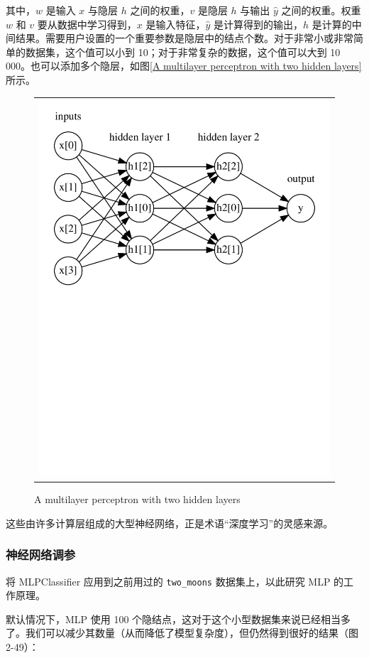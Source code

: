 其中，$w$ 是输入 $x$ 与隐层 $h$ 之间的权重，$v$ 是隐层 $h$ 与输出 $\hat{y}$ 之间的权重。权重 $w$ 和 $v$ 要从数据中学习得到，$x$ 是输入特征，$\hat{y}$ 是计算得到的输出，$h$ 是计算的中间结果。需要用户设置的一个重要参数是隐层中的结点个数。对于非常小或非常简单的数据集，这个值可以小到 10；对于非常复杂的数据，这个值可以大到 10 000。也可以添加多个隐层，如图\autoref{A multilayer perceptron with two hidden layers}所示。

\begin{figure}
    \centering
    \begin{tabular}{c}
        \includegraphics[page=1, width=.65\textwidth]{../Codes/Figures/A multilayer perceptron with two hidden layers.pdf} \\
    \end{tabular}
    \caption{A multilayer perceptron with two hidden layers}
    \label{A multilayer perceptron with two hidden layers}
\end{figure}

这些由许多计算层组成的大型神经网络，正是术语“深度学习”的灵感来源。

\subsubsection{神经网络调参}
将 MLPClassifier 应用到之前用过的 \verb|two_moons| 数据集上，以此研究 MLP 的工作原理。

默认情况下，MLP 使用 100 个隐结点，这对于这个小型数据集来说已经相当多了。我们可以减少其数量（从而降低了模型复杂度），但仍然得到很好的结果（图 2-49）：

